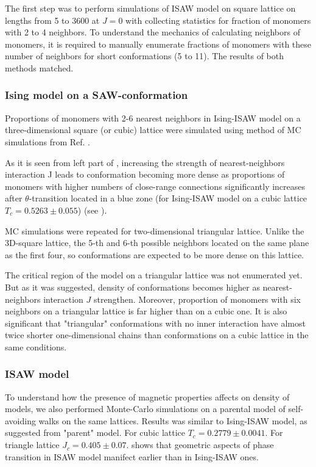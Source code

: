 The first step was to perform simulations of ISAW model on square lattice on lengths from 5 to 3600 at $J=0$ with collecting statistics for fraction of monomers with 2 to 4 neighbors. 
To understand the mechanics of calculating neighbors of monomers, it is required to manually enumerate fractions of monomers with these number of neighbors for short conformations (5 to 11). 
The results of both methods matched.


\subsubsection{Ising model on a SAW-conformation}

Proportions of monomers with 2-6 nearest neighbors in Ising-ISAW model on a three-dimensional square (or cubic) lattice were simulated using method of MC simulations from Ref. \cite{faizullina2021critical}.

As it is seen from left part of , increasing the strength of nearest-neighbors interaction J leads to conformation becoming more dense as proportions of monomers with higher numbers of close-range connections significantly increases after $\theta$-transition located in a blue zone (for Ising-ISAW model on a cubic lattice $T_{c} = 0.5263 \pm 0.055$\cite{Foster2021}) (see ).

MC simulations were repeated for two-dimensional triangular lattice. 
Unlike the 3D-square lattice, the 5-th and 6-th possible neighbors located on the same plane as the first four, so conformations are expected to be more dense on this lattice.

The critical region of the model on a triangular lattice was not enumerated yet. 
But as it was suggested, density of conformations becomes higher as nearest-neighbors interaction $J$ strengthen. 
Moreover, proportion of monomers with six neighbors on a triangular lattice is far higher than on a cubic one. 
It is also significant that "triangular" conformations with no inner interaction have almost twice shorter one-dimensional chains than conformations on a cubic lattice in the same conditions.

\subsubsection{ISAW model}

To understand how the presence of magnetic properties affects on density of models, we also performed Monte-Carlo simulations on a parental model of self-avoiding walks on the same lattices. Results was similar to Ising-ISAW model, as suggested from "parent" model. For cubic lattice $T_{c} = 0.2779\pm 0.0041 $\cite{Tesi1996}. For triangle lattice $J_{c} = 0.405 \pm 0.07 $\cite{Privman1986}.  shows that geometric aspects of phase transition in ISAW model manifect earlier than in Ising-ISAW ones.  



